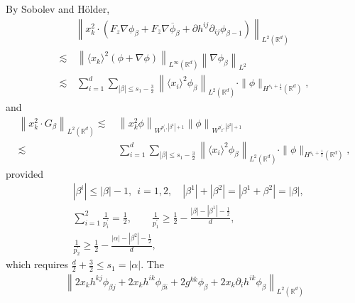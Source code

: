 \documentclass[10pt,twoside,a4paper]{article}
\numberwithin{equation}{section}\allowdisplaybreaks
\def\leq{\leqslant}
\def\geq{\geqslant}
\begin{document}
By Sobolev   and H\"older, 
\begin{align} \label{qenxc3}
	&\left\|  x^2_k\cdot\left( F_z\nabla \phi_\beta+F_{\overline{z}}\nabla \overline{\phi}_\beta+\partial h^{ij}\partial_{ij } \phi_{\beta -1} \right) \right\|_{L^2(\mathbb{R}^d)}\\
	 \lesssim &\,\left\|\langle x_k\rangle^2\left(\phi+ \nabla \phi\right)\right\|_{L^\infty (\mathbb{R}^d)} \left\| \nabla\phi_\beta\right\|_{L^{2}}\nonumber \\
	\lesssim &\, \sum_{i=1}^d\sum_{|\beta| \leq s_1-\frac 32}\left\| \langle x_i\rangle^2 \phi_{\beta}\right\|_{L^2(\mathbb{R}^d)} \cdot \|\phi\|_{H^{s_1+\frac 12}(\mathbb{R}^{d})},\nonumber
\end{align}
and
\begin{align}
		\left\| x^2_k\cdot G_\beta \right\|_{L^2(\mathbb{R}^d)}\lesssim &\,\left\|  x^2_k \phi \right\|_{W^{p^\prime_1, |\beta^1|+1}} \left\|  \phi \right\|_{W^{p^\prime_2,|\beta^2|+1}}\\
		\lesssim &\,\sum_{i=1}^d\sum_{|\beta| \leq s_1-\frac 32}\left\| \langle x_i\rangle^2 \phi_{\beta}\right\|_{L^2(\mathbb{R}^d)} \cdot \|\phi\|_{H^{s_1+\frac 12}(\mathbb{R}^{d})},\nonumber
\end{align}
provided 
\begin{align*}
		& \left|\beta^i\right|\leq \left|\beta\right|-1,~~i=1,2, \quad  \left|\beta^1\right|+\left|\beta^2\right|=\left|\beta^1+\beta^2\right|= \left|\beta\right|, \\
	&	\sum_{i=1}^2 \frac{1}{p^\prime_i}=\frac 12,\qquad
	\frac{1}{p_1^\prime}\geq \frac 12-\frac{|\beta|-|\beta^1|-\frac12}{d}, \nonumber\\
	&\frac{1}{p_2^\prime}\geq \frac 12-\frac{|\alpha|-|\beta^2|-\frac 12}{d},\nonumber
\end{align*}
which requires $  \frac d2+ \frac 32\leq s_1 =|\alpha|. $
The 
\begin{align*}
	\left\|   2 x_k h^{kj} \phi_{\beta j}+2 x_k h^{ik} \phi_{\beta i}+2 g^{kk} \phi_{\beta } +2 x_k \partial_i h^{ik} \phi_{\beta }   \right\|_{L^2(\mathbb{R}^d)}
\end{align*}
\end{document}
